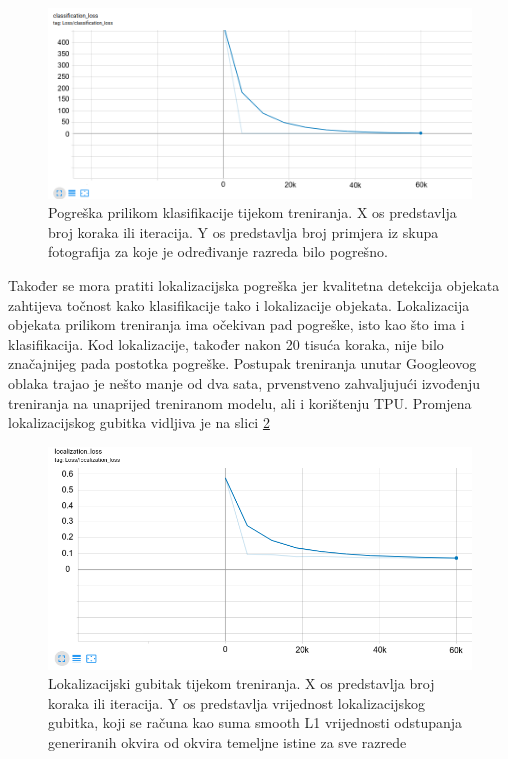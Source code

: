 \begin{figure}[htb]
    \centering
    \includegraphics[width=12cm]{img/class-loss.png}
    \caption{Pogreška prilikom klasifikacije tijekom treniranja. X os predstavlja broj koraka ili iteracija. Y os predstavlja 
    broj primjera iz skupa fotografija za koje je određivanje razreda bilo pogrešno.}
    \label{Class-Loss}
\end{figure}


Također se mora pratiti lokalizacijska pogreška jer kvalitetna detekcija objekata zahtijeva točnost kako klasifikacije
tako i lokalizacije objekata.
Lokalizacija objekata prilikom treniranja ima očekivan pad pogreške, isto kao što ima i klasifikacija. Kod lokalizacije, također nakon 20 tisuća koraka, nije bilo značajnijeg pada postotka pogreške. 
Postupak treniranja unutar Googleovog oblaka trajao je nešto manje od dva sata, prvenstveno zahvaljujući izvođenju treniranja na unaprijed treniranom modelu, ali i korištenju TPU. Promjena lokalizacijskog gubitka vidljiva je na slici \ref{Local-Loss} 

\begin{figure}[htb]
    \centering
    \includegraphics[width=12cm]{img/local-loss.png}
    \caption{Lokalizacijski gubitak tijekom treniranja. X os predstavlja broj koraka ili iteracija. Y os predstavlja vrijednost lokalizacijskog gubitka, koji 
    se računa kao suma smooth L1 vrijednosti odstupanja generiranih okvira od okvira temeljne istine za sve razrede}
    \label{Local-Loss}
\end{figure}


